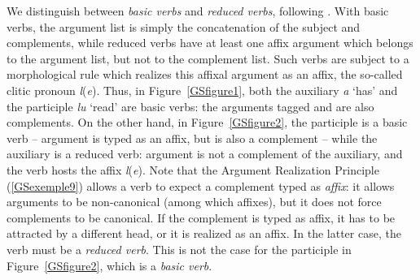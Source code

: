 
We distinguish between \emph{basic verbs} and \emph{reduced verbs}, following \citet{AGS1998}. With basic verbs, the argument list is simply the concatenation of the subject and complements, while reduced verbs have at least one affix argument which belongs to the argument list, but not to the complement list. Such verbs are subject to a morphological rule which realizes this affixal argument as an affix, the so-called clitic pronoun \emph{l}(\emph{e}). Thus, in Figure~\ref{GSfigure1}, both the auxiliary \emph{a} `has' and the participle \emph{lu} `read' are basic verbs: the arguments tagged  and  are also complements. On the other hand, in Figure~\ref{GSfigure2}, the participle is a basic verb -- argument  is typed as an affix, but is also a complement -- while the auxiliary is a reduced verb: argument  is not a complement of the auxiliary, and the verb hosts the affix \emph{l}(\emph{e}). Note that the Argument Realization Principle (\ref{GSexemple9}) allows a verb to expect a complement typed as \emph{affix}: it allows arguments to be non-canonical (among which affixes), but it does not force complements to be canonical. If the complement is typed as affix, it has to be attracted by a different head, or it is realized as an affix. In the latter case, the verb must be a \emph{reduced verb}. This is not the case for the participle in Figure~\ref{GSfigure2}, which is a \emph{basic verb}.

